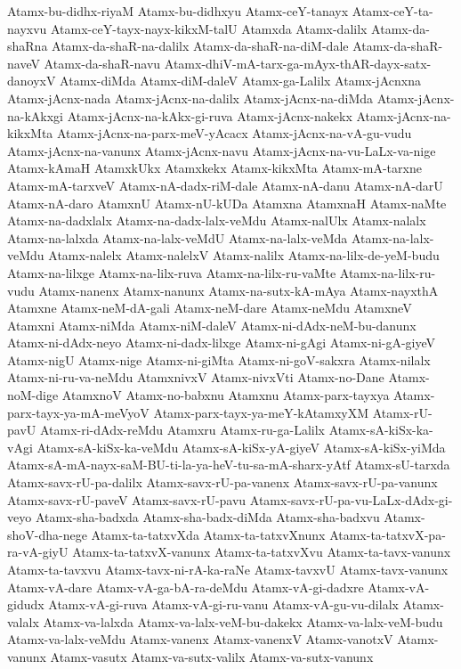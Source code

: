 {Atamx-bu-didhx-riyaM
Atamx-bu-didhxyu
Atamx-ceY-tanayx
Atamx-ceY-ta-nayxvu
Atamx-ceY-tayx-nayx-kikxM-talU
Atamxda
Atamx-dalilx
Atamx-da-shaRna
Atamx-da-shaR-na-dalilx
Atamx-da-shaR-na-diM-dale
Atamx-da-shaR-naveV
Atamx-da-shaR-navu
Atamx-dhiV-mA-tarx-ga-mAyx-thAR-dayx-satx-danoyxV
Atamx-diMda
Atamx-diM-daleV
Atamx-ga-Lalilx
Atamx-jAcnxna
Atamx-jAcnx-nada
Atamx-jAcnx-na-dalilx
Atamx-jAcnx-na-diMda
Atamx-jAcnx-na-kAkxgi
Atamx-jAcnx-na-kAkx-gi-ruva
Atamx-jAcnx-nakekx
Atamx-jAcnx-na-kikxMta
Atamx-jAcnx-na-parx-meV-yAcacx
Atamx-jAcnx-na-vA-gu-vudu
Atamx-jAcnx-na-vanunx
Atamx-jAcnx-navu
Atamx-jAcnx-na-vu-LaLx-va-nige
Atamx-kAmaH
AtamxkUkx
Atamxkekx
Atamx-kikxMta
Atamx-mA-tarxne
Atamx-mA-tarxveV
Atamx-nA-dadx-riM-dale
Atamx-nA-danu
Atamx-nA-darU
Atamx-nA-daro
AtamxnU
Atamx-nU-kUDa
Atamxna
AtamxnaH
Atamx-naMte
Atamx-na-dadxlalx
Atamx-na-dadx-lalx-veMdu
Atamx-nalUlx
Atamx-nalalx
Atamx-na-lalxda
Atamx-na-lalx-veMdU
Atamx-na-lalx-veMda
Atamx-na-lalx-veMdu
Atamx-nalelx
Atamx-nalelxV
Atamx-nalilx
Atamx-na-lilx-de-yeM-budu
Atamx-na-lilxge
Atamx-na-lilx-ruva
Atamx-na-lilx-ru-vaMte
Atamx-na-lilx-ru-vudu
Atamx-nanenx
Atamx-nanunx
Atamx-na-sutx-kA-mAya
Atamx-nayxthA
Atamxne
Atamx-neM-dA-gali
Atamx-neM-dare
Atamx-neMdu
AtamxneV
Atamxni
Atamx-niMda
Atamx-niM-daleV
Atamx-ni-dAdx-neM-bu-danunx
Atamx-ni-dAdx-neyo
Atamx-ni-dadx-lilxge
Atamx-ni-gAgi
Atamx-ni-gA-giyeV
Atamx-nigU
Atamx-nige
Atamx-ni-giMta
Atamx-ni-goV-sakxra
Atamx-nilalx
Atamx-ni-ru-va-neMdu
AtamxnivxV
Atamx-nivxVti
Atamx-no-Dane
Atamx-noM-dige
AtamxnoV
Atamx-no-babxnu
Atamxnu
Atamx-parx-tayxya
Atamx-parx-tayx-ya-mA-meVyoV
Atamx-parx-tayx-ya-meY-kAtamxyXM
Atamx-rU-pavU
Atamx-ri-dAdx-reMdu
Atamxru
Atamx-ru-ga-Lalilx
Atamx-sA-kiSx-ka-vAgi
Atamx-sA-kiSx-ka-veMdu
Atamx-sA-kiSx-yA-giyeV
Atamx-sA-kiSx-yiMda
Atamx-sA-mA-nayx-saM-BU-ti-la-ya-heV-tu-sa-mA-sharx-yAtf
Atamx-sU-tarxda
Atamx-savx-rU-pa-dalilx
Atamx-savx-rU-pa-vanenx
Atamx-savx-rU-pa-vanunx
Atamx-savx-rU-paveV
Atamx-savx-rU-pavu
Atamx-savx-rU-pa-vu-LaLx-dAdx-gi-veyo
Atamx-sha-badxda
Atamx-sha-badx-diMda
Atamx-sha-badxvu
Atamx-shoV-dha-nege
Atamx-ta-tatxvXda
Atamx-ta-tatxvXnunx
Atamx-ta-tatxvX-pa-ra-vA-giyU
Atamx-ta-tatxvX-vanunx
Atamx-ta-tatxvXvu
Atamx-ta-tavx-vanunx
Atamx-ta-tavxvu
Atamx-tavx-ni-rA-ka-raNe
Atamx-tavxvU
Atamx-tavx-vanunx
Atamx-vA-dare
Atamx-vA-ga-bA-ra-deMdu
Atamx-vA-gi-dadxre
Atamx-vA-gidudx
Atamx-vA-gi-ruva
Atamx-vA-gi-ru-vanu
Atamx-vA-gu-vu-dilalx
Atamx-valalx
Atamx-va-lalxda
Atamx-va-lalx-veM-bu-dakekx
Atamx-va-lalx-veM-budu
Atamx-va-lalx-veMdu
Atamx-vanenx
Atamx-vanenxV
Atamx-vanotxV
Atamx-vanunx
Atamx-vasutx
Atamx-va-sutx-valilx
Atamx-va-sutx-vanunx
}
